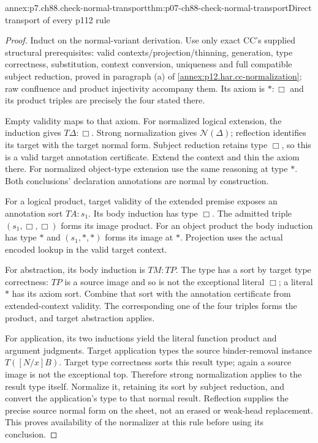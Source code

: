 \begin{annexitem}{annex:p7.ch88.check-normal-transport}{thm:p07-ch88-check-normal-transport}{Direct transport of every p112 rule}
\begin{proof}
Induct on the normal-variant derivation. Use only exact CC's supplied
structural prerequisites: valid contexts/projection/thinning,
generation, type correctness, substitution, context conversion,
uniqueness and full compatible subject reduction, proved in paragraph
(a) of \cref{annex:p12.har.cc-normalization}; raw confluence and
product injectivity accompany them. Its axiom is \(\ast:\Box\)
and its product triples are precisely the four stated there.

Empty validity maps to that axiom. For normalized logical extension,
the induction gives \(T\Delta:\Box\). Strong normalization gives
\(\mathcal N(\Delta)\); reflection identifies its target with the
target normal form. Subject reduction retains type \(\Box\), so
this is a valid target annotation certificate. Extend the context
and thin the axiom there. For normalized object-type extension use
the same reasoning at type \(\ast\). Both conclusions' declaration
annotations are normal by construction.

For a logical product, target validity of the extended premise exposes
an annotation sort \(TA:s_1\). Its body induction has type \(\Box\).
The admitted triple \((s_1,\Box,\Box)\) forms its image product.
For an object product the body induction has type \(\ast\) and
\((s_1,\ast,\ast)\) forms its image at \(\ast\). Projection
uses the actual encoded lookup in the valid target context.

For abstraction, its body induction is \(TM:TP\). The type has a
sort by target type correctness: \(TP\) is a source image and so
is not the exceptional literal \(\Box\); a literal \(\ast\)
has its axiom sort. Combine that sort with the annotation certificate
from extended-context validity. The corresponding one of the four
triples forms the product, and target abstraction applies.

For application, its two inductions yield the literal function product
and argument judgments. Target application types the source
binder-removal instance \(T([N/x]B)\). Target type correctness sorts
this result type; again a source image is not the exceptional top.
Therefore strong normalization applies to the result type itself.
Normalize it, retaining its sort by subject reduction, and convert
the application's type to that normal result. Reflection supplies
the precise source normal form on the sheet, not an erased or
weak-head replacement. This proves availability of the normalizer
at this rule before using its conclusion.


\end{proof}
\end{annexitem}
